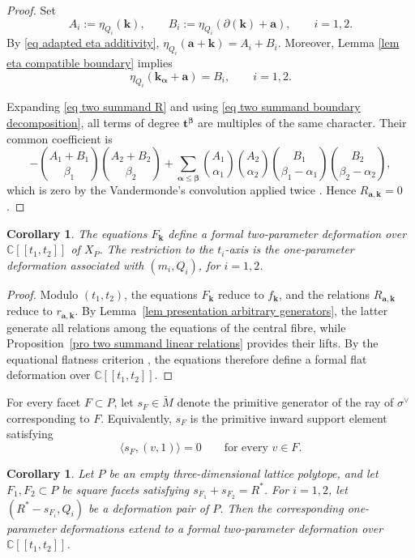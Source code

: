 \documentclass[11pt]{amsart}
\numberwithin{equation}{section}
\theoremstyle{plain}
\newtheorem{corollary}[theorem]{Corollary}
\theoremstyle{definition}
\newcommand{\0}{$0$-mutable}
\newcommand{\CC}{\ensuremath{\mathbb{C}}}
\newcommand{\bfa}{\ensuremath{\mathbf{a}}}
\newcommand{\bfk}{\ensuremath{\mathbf{k}}}
\renewcommand{\1}{$1$-rigid}
\renewcommand{\0}{$0$-mutable}
\begin{document}
\begin{proof}
Set
\[
A_i:=\eta_{Q_i}(\bfk),
\qquad
B_i:=\eta_{Q_i}(\partial(\bfk)+\bfa),
\qquad i=1,2.
\]
By \eqref{eq adapted eta additivity},
$
\eta_{Q_i}(\bfa+\bfk)=A_i+B_i.
$
Moreover, Lemma \ref{lem eta compatible boundary} implies
\[
\eta_{Q_i}(\bfk_{\boldsymbol\alpha}+\bfa)=B_i,
\qquad i=1,2.
\]

Expanding \eqref{eq two summand R} and using
\eqref{eq two summand boundary decomposition}, all terms of degree
\(\mathbf t^{\boldsymbol\beta}\) are multiples of the same character.
Their common coefficient is
\[
-
\binom{A_1+B_1}{\beta_1}
\binom{A_2+B_2}{\beta_2}
+
\sum_{\boldsymbol\alpha\leq\boldsymbol\beta}
\binom{A_1}{\alpha_1}
\binom{A_2}{\alpha_2}
\binom{B_1}{\beta_1-\alpha_1}
\binom{B_2}{\beta_2-\alpha_2},
\]
{which is zero by the Vandermonde's convolution applied twice \cite[Equation~(5.27), pp.~170]{GKP94}.}
Hence \(R_{\bfa,\bfk}=0\).
\end{proof}

\begin{corollary}
\label{cor two compatible deformations}
The equations \(F_{\bfk}\) define a formal two-parameter deformation over 
$
\CC[[t_1,t_2]]
$
of \(X_P\). 
The restriction to the \(t_i\)-axis is the one-parameter deformation
associated with \((m_i,Q_i)\), for \(i=1,2\).
\end{corollary}

\begin{proof}
Modulo \((t_1,t_2)\), the equations \(F_{\bfk}\) reduce to
\(f_{\bfk}\), and the relations \(R_{\bfa,\bfk}\) reduce to
\(r_{\bfa,\bfk}\). By
Lemma~\ref{lem presentation arbitrary generators}, the latter generate
all relations among the equations of the central fibre, while
Proposition~\ref{pro two summand linear relations} provides their
lifts. {By the equational flatness criterion
\cite[Lemma~3.5]{Fil26}, the equations therefore define a
formal flat deformation over $\CC[[t_1,t_2]]$.}
\end{proof}
\medskip

{For every facet \(F\subset P\), let \(s_F\in\widetilde M\) denote the
primitive generator of the ray of \(\sigma^\vee\) corresponding to \(F\).
Equivalently, \(s_F\) is the primitive inward support element satisfying
\[
\langle s_F,(v,1)\rangle=0
\qquad\text{for every }v\in F.
\]}


\begin{corollary}
\label{cor parallel squares simultaneous deformation}
Let \(P\) be an empty three-dimensional lattice polytope, and let
\(F_1,F_2\subset P\) be square facets satisfying
\(s_{F_1}+s_{F_2}=R^*\). For \(i=1,2\), let
\((R^*-s_{F_i},Q_i)\) be a deformation pair of \(P\). Then the
corresponding one-parameter deformations extend to a formal
two-parameter deformation over \(\CC[[t_1,t_2]]\).
\end{corollary}
\end{document}
